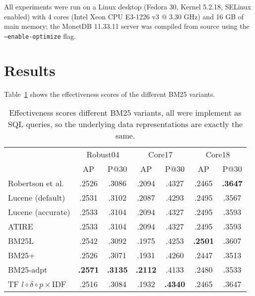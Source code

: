 All experiments were run on a Linux desktop (Fedora 30, Kernel 5.2.18, SELinux enabled) with 4 cores (Intel Xeon CPU E3-1226 v3 @ 3.30 GHz) and 16 GB of main memory; the MonetDB 11.33.11 server was compiled from source using the \texttt{---enable-optimize} flag.


\section{Results}
Table~\ref{bm25_variant_results} shows the effectiveness scores of the different BM25 variants.  

\begin{table}
	\centering
	\caption{Effectiveness scores different BM25 variants, all were implement as SQL queries, so the underlying data representations are exactly the same. }
	\label{bm25_variant_results}
	\begin{tabular}{l| c c c c c c}
		\toprule
		&\multicolumn{2}{c}{Robust04}&\multicolumn{2}{c}{Core17}&\multicolumn{2}{c}{Core18}\\
		&AP&P@30&AP&P@30&AP&P@30\\
		\midrule
		Robertson et al. & .2526 & .3086 & .2094 & .4327 & .2465 & \textbf{.3647} \\ 
		Lucene (default) & .2531 & .3102 & .2087 & .4293 & .2495 & .3567 \\ 
		Lucene (accurate) & .2533 & .3104 & .2094 & .4327 & .2495 & .3593 \\ 
		ATIRE & .2533 & .3104 & .2094 & .4327 & .2495 & .3593 \\ 
		BM25L & .2542 & .3092 & .1975 & .4253 & \textbf{.2501} & .3607 \\ 
		BM25+ & .2526 & .3071 & .1931 & .4260 & .2447 & .3513 \\ 
		BM25-adpt & \textbf{.2571} & \textbf{.3135} & \textbf{.2112} & .4133 & .2480 & .3533\\ 
		TF $l\circ\delta\circ p\times$IDF & .2516 & .3084 & .1932 & \textbf{.4340} & .2465 & .3647\\ 
		\bottomrule
	\end{tabular}
\end{table}

